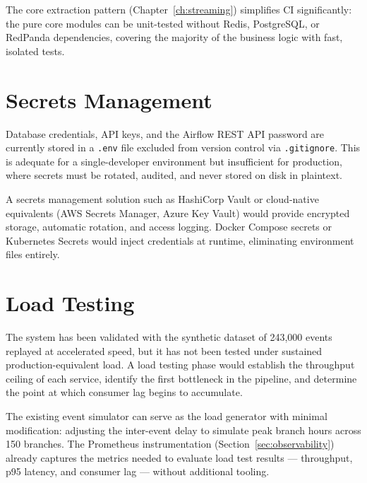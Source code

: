 The core extraction pattern (Chapter~\ref{ch:streaming}) simplifies CI
significantly: the pure core modules can be unit-tested without Redis,
PostgreSQL, or RedPanda dependencies, covering the majority of the
business logic with fast, isolated tests.


\section{Secrets Management}
\label{sec:secrets}

Database credentials, API keys, and the Airflow REST API password are
currently stored in a \texttt{.env} file excluded from version control
via \texttt{.gitignore}. This is adequate for a single-developer
environment but insufficient for production, where secrets must be
rotated, audited, and never stored on disk in plaintext.

A secrets management solution such as HashiCorp Vault or cloud-native
equivalents (AWS Secrets Manager, Azure Key Vault) would provide
encrypted storage, automatic rotation, and access logging. Docker Compose
secrets or Kubernetes Secrets would inject credentials at runtime,
eliminating environment files entirely.


\section{Load Testing}
\label{sec:load-testing}

The system has been validated with the synthetic dataset of 243,000 events
replayed at accelerated speed, but it has not been tested under sustained
production-equivalent load. A load testing phase would establish the
throughput ceiling of each service, identify the first bottleneck in the
pipeline, and determine the point at which consumer lag begins to
accumulate.

The existing event simulator can serve as the load generator with minimal
modification: adjusting the inter-event delay to simulate peak branch
hours across 150 branches. The Prometheus instrumentation
(Section~\ref{sec:observability}) already captures the metrics needed to
evaluate load test results --- throughput, p95 latency, and consumer lag
--- without additional tooling.


